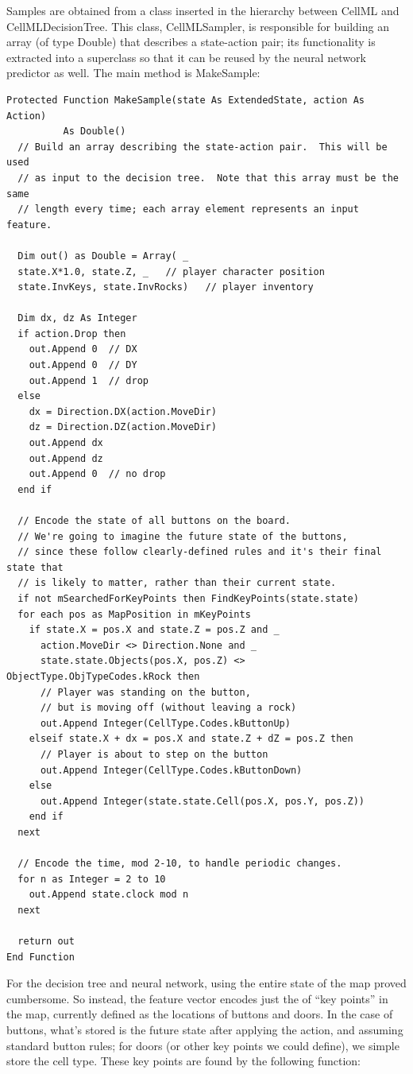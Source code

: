 \documentclass{article}
\begin{document}
Samples are obtained from a class inserted in the hierarchy between CellML and CellMLDecisionTree.  This class, CellMLSampler, is responsible for building an array (of type Double) that describes a state-action pair; its functionality is extracted into a superclass so that it can be reused by the neural network predictor as well.  The main method is MakeSample:

\begin{lstlisting}
Protected Function MakeSample(state As ExtendedState, action As Action) 
          As Double()
  // Build an array describing the state-action pair.  This will be used
  // as input to the decision tree.  Note that this array must be the same
  // length every time; each array element represents an input feature.
  
  Dim out() as Double = Array( _
  state.X*1.0, state.Z, _   // player character position
  state.InvKeys, state.InvRocks)   // player inventory
  
  Dim dx, dz As Integer
  if action.Drop then
    out.Append 0  // DX
    out.Append 0  // DY
    out.Append 1  // drop
  else
    dx = Direction.DX(action.MoveDir)
    dz = Direction.DZ(action.MoveDir)
    out.Append dx
    out.Append dz
    out.Append 0  // no drop
  end if
  
  // Encode the state of all buttons on the board.
  // We're going to imagine the future state of the buttons,
  // since these follow clearly-defined rules and it's their final state that
  // is likely to matter, rather than their current state.
  if not mSearchedForKeyPoints then FindKeyPoints(state.state)
  for each pos as MapPosition in mKeyPoints
    if state.X = pos.X and state.Z = pos.Z and _
      action.MoveDir <> Direction.None and _
      state.state.Objects(pos.X, pos.Z) <> ObjectType.ObjTypeCodes.kRock then
      // Player was standing on the button,
      // but is moving off (without leaving a rock)
      out.Append Integer(CellType.Codes.kButtonUp)
    elseif state.X + dx = pos.X and state.Z + dZ = pos.Z then
      // Player is about to step on the button
      out.Append Integer(CellType.Codes.kButtonDown)
    else
      out.Append Integer(state.state.Cell(pos.X, pos.Y, pos.Z))
    end if
  next
  
  // Encode the time, mod 2-10, to handle periodic changes.
  for n as Integer = 2 to 10
    out.Append state.clock mod n
  next
  
  return out
End Function
\end{lstlisting}

For the decision tree and neural network, using the entire state of the map proved cumbersome.  So instead, the feature vector encodes just the of ``key points'' in the map, currently defined as the locations of buttons and doors.  In the case of buttons, what's stored is the future state after applying the action, and assuming standard button rules; for doors (or other key points we could define), we simple store the cell type.  These key points are found by the following function:
\end{document}

